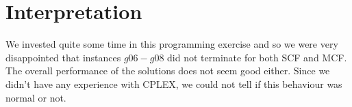 \section{Interpretation}

We invested quite some time in this programming exercise and so we were very disappointed that instances $g06 - g08$ did not terminate for both SCF and MCF. The overall performance of the solutions does not seem good either. Since we didn't have any experience with CPLEX, we could not tell if this behaviour was normal or not. 